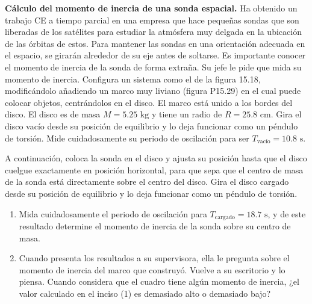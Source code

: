 \item \textbf{Cálculo del momento de inercia de una sonda espacial.}
Ha obtenido un trabajo CE a tiempo parcial en una empresa que hace pequeñas sondas que son liberadas de los satélites para estudiar la atmósfera muy delgada en la ubicación de las órbitas de estos. Para mantener las sondas en una orientación adecuada en el espacio, se girarán alrededor de su eje antes de soltarse. Es importante conocer el momento de inercia de la sonda de forma extraña. Su jefe le pide que mida su momento de inercia. Configura un sistema como el de la figura 15.18, modificándolo añadiendo un marco muy liviano (figura P15.29) en el cual puede colocar objetos, centrándolos en el disco. El marco está unido a los bordes del disco. El disco es de masa $M = 5.25\text{ kg}$ y tiene un radio de $R = 25.8\text{ cm}$. Gira el disco vacío desde su posición de equilibrio y lo deja funcionar como un péndulo de torsión. Mide cuidadosamente su periodo de oscilación para ser $T_{\text{vacío}} = 10.8\text{ s}$.

A continuación, coloca la sonda en el disco y ajusta su posición hasta que el disco cuelgue exactamente en posición horizontal, para que sepa que el centro de masa de la sonda está directamente sobre el centro del disco. Gira el disco cargado desde su posición de equilibrio y lo deja funcionar como un péndulo de torsión.
\begin{enumerate}
    \item Mida cuidadosamente el periodo de oscilación para $T_{\text{cargado}} = 18.7\text{ s}$, y de este resultado determine el momento de inercia de la sonda sobre su centro de masa.
    \item Cuando presenta los resultados a su supervisora, ella le pregunta sobre el momento de inercia del marco que construyó. Vuelve a su escritorio y lo piensa. Cuando considera que el cuadro tiene algún momento de inercia, ¿el valor calculado en el inciso (1) es demasiado alto o demasiado bajo?
\end{enumerate}